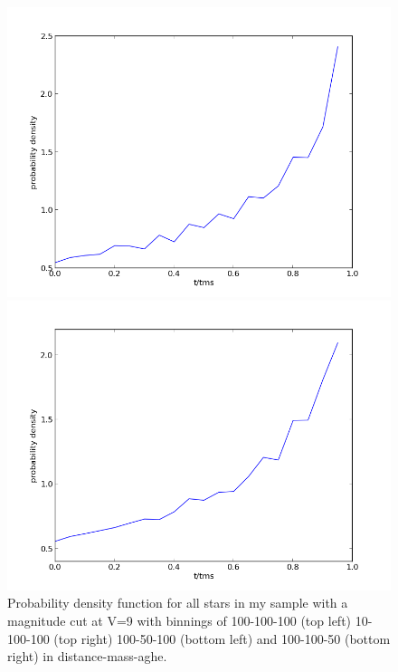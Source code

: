 \documentclass[a4paper,10pt]{article}
\begin{document}
\begin{figure}[h!]
\begin{minipage}{0.49\textwidth}
  \end{minipage}
  \begin{minipage}{0.49\textwidth}
   \includegraphics[width=\textwidth]{100-50-100}
  \end{minipage}
  \begin{minipage}{0.49\textwidth}
   \includegraphics[width=\textwidth]{100-100-50}
  \end{minipage}
   \caption{Probability density function for all stars in my sample with a magnitude cut at V=9 with binnings of 100-100-100 (top left) 
   10-100-100 (top right) 100-50-100 (bottom left) and 100-100-50 (bottom right) in distance-mass-aghe.\label{binnings}}   
 \end{figure}
 
\end{document}
